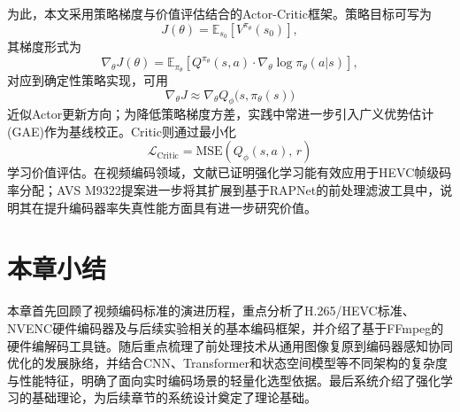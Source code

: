 为此，本文采用策略梯度与价值评估结合的Actor-Critic框架。策略目标可写为
\begin{equation}
  J(\theta) = \mathbb{E}_{s_0}\left[V^{\pi_\theta}(s_0)\right],
  \label{eq:policy-objective}
\end{equation}
其梯度形式为
\begin{equation}
  \nabla_\theta J(\theta) = \mathbb{E}_{\pi_\theta}\left[Q^{\pi_\theta}(s,a)\cdot\nabla_\theta\log\pi_\theta(a|s)\right],
  \label{eq:policy-gradient}
\end{equation}
对应到确定性策略实现，可用
\begin{equation}
  \nabla_\theta J \approx \nabla_\theta Q_\phi\big(s,\pi_\theta(s)\big)
  \label{eq:actor-update}
\end{equation}
近似Actor更新方向；为降低策略梯度方差，实践中常进一步引入广义优势估计(GAE)\cite{ref40-schulman2016gae}作为基线校正。Critic则通过最小化
\begin{equation}
  \mathcal{L}_{\text{Critic}} = \mathrm{MSE}\left(Q_\phi(s,a),\,r\right)
  \label{eq:critic-loss-rl2}
\end{equation}
学习价值评估。在视频编码领域，文献\cite{ref3-chen2018rl}已证明强化学习能有效应用于HEVC帧级码率分配；AVS M9322提案\cite{ref27-zhao2025rapnet}进一步将其扩展到基于RAPNet的前处理滤波工具中，说明其在提升编码器率失真性能方面具有进一步研究价值。

\section{本章小结}

本章首先回顾了视频编码标准的演进历程，重点分析了H.265/HEVC标准\cite{ref10-sullivan2012hevc}、NVENC硬件编码器及与后续实验相关的基本编码框架，并介绍了基于FFmpeg的硬件编解码工具链。随后重点梳理了前处理技术从通用图像复原到编码器感知协同优化的发展脉络，并结合CNN\cite{ref5-ho2021rrdncnn}、Transformer\cite{ref25-liang2021swinir,ref22-liang2022vrt}和状态空间模型\cite{ref21-guo2024mambaIRv2}等不同架构的复杂度与性能特征，明确了面向实时编码场景的轻量化选型依据。最后系统介绍了强化学习的基础理论，为后续章节的系统设计奠定了理论基础。
